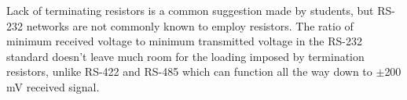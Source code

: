 Lack of terminating resistors is a common suggestion made by students, but RS-232 networks are not commonly known to employ resistors.  The ratio of minimum received voltage to minimum transmitted voltage in the RS-232 standard doesn't leave much room for the loading imposed by termination resistors, unlike RS-422 and RS-485 which can function all the way down to $\pm$200 mV received signal.




